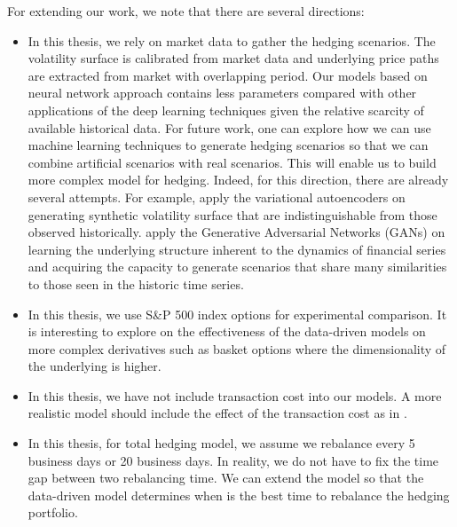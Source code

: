 \documentclass[letterpaper,12pt,titlepage,oneside,final]{book}
\numberwithin{equation}{section}
\theoremstyle{definition}
\begin{document}
For extending our work, we note that there are several directions:
\begin{itemize}
	\item In this thesis, we rely on market data to gather the hedging scenarios.  The volatility surface is calibrated from market data and underlying price paths are extracted from market with overlapping period. Our models based on neural network approach contains less parameters compared with other applications of the deep learning techniques given the relative scarcity of available historical data. 
	For future work, one can explore how we can use machine learning techniques to generate hedging scenarios so that we can combine artificial scenarios with real scenarios. This will enable us to build more complex model for hedging.
	Indeed, for this direction, there are already several attempts. For example, \citet{bergeron2021variational} apply the variational autoencoders \cite{kingma2013auto} on generating synthetic volatility surface  that are indistinguishable from those observed historically. \citet{pardo2020mitigating} apply the  Generative Adversarial Networks (GANs) \cite{goodfellow2014generative} on learning  the underlying structure inherent to the dynamics of financial series and acquiring the capacity to generate scenarios that share many similarities to those seen in the historic  time series.  
	\item In this thesis, we use S\&P 500 index options for experimental comparison. It is interesting to explore on the effectiveness of the data-driven models on more complex derivatives such as basket options where the dimensionality of the underlying is higher. 
	\item In this thesis, we have not include transaction cost into our models. A more realistic model should include the effect of the transaction cost as in \cite{buehler2019deep}. 
	\item  In this thesis, for total hedging  model, we assume we rebalance every 5 business days or 20 business days. In reality, we do not have to fix the time gap between two rebalancing time. We can extend the model so that the data-driven model determines when is the best time to rebalance the hedging portfolio. 
\end{itemize}



\end{document}
